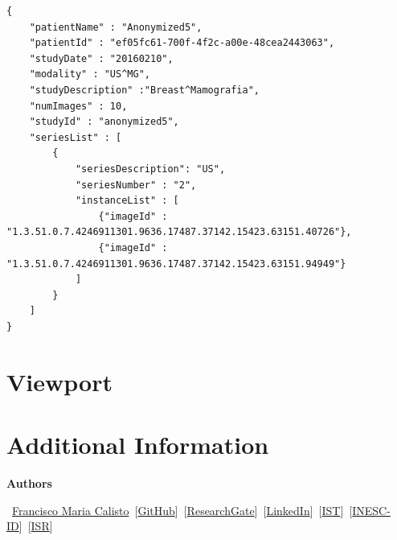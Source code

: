 \documentclass{tufte-book} %
\begin{document}
\begin{lstlisting}
{
    "patientName" : "Anonymized5",
    "patientId" : "ef05fc61-700f-4f2c-a00e-48cea2443063",
    "studyDate" : "20160210",
    "modality" : "US^MG",
    "studyDescription" :"Breast^Mamografia",
    "numImages" : 10,
    "studyId" : "anonymized5",
    "seriesList" : [
        {
            "seriesDescription": "US",
            "seriesNumber" : "2",
            "instanceList" : [
                {"imageId" : "1.3.51.0.7.4246911301.9636.17487.37142.15423.63151.40726"},
                {"imageId" : "1.3.51.0.7.4246911301.9636.17487.37142.15423.63151.94949"}
            ]
        }
    ]
}
\end{lstlisting}



\chapter{Viewport}


\chapter{Additional Information}

\textbf{Authors}

\hfill

\textemdash~\href{http://franciscocalisto.me/}{Francisco Maria Calisto}~[\href{https://github.com/FMCalisto}{GitHub}]~[\href{https://www.researchgate.net/profile/Francisco_Maria_Calisto}{ResearchGate}]~[\href{https://www.linkedin.com/in/fmcalisto/}{LinkedIn}]~[\href{http://web.tecnico.ulisboa.pt/francisco.calisto/}{IST}]~[\href{http://www.inesc-id.pt/member/15650/}{INESC-ID}]~[\href{http://welcome.isr.tecnico.ulisboa.pt/author/franciscomariagalambaferraricalisto/}{ISR}]
\end{document}

